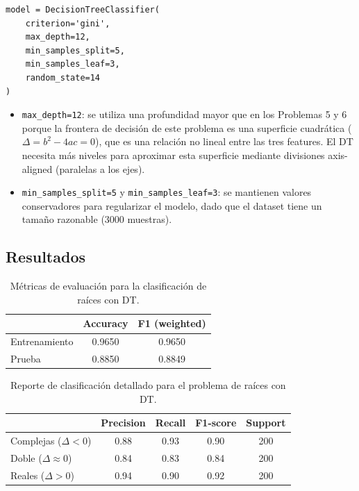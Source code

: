 \documentclass{article}
\begin{document}
\begin{lstlisting}
model = DecisionTreeClassifier(
    criterion='gini',
    max_depth=12,
    min_samples_split=5,
    min_samples_leaf=3,
    random_state=14
)
\end{lstlisting}

\begin{itemize}
    \item \texttt{max\_depth=12}: se utiliza una profundidad mayor que en los Problemas 5 y 6 porque la frontera de decisión de este problema es una superficie cuadrática (\(\Delta = b^2 - 4ac = 0\)), que es una relación no lineal entre las tres features. El DT necesita más niveles para aproximar esta superficie mediante divisiones axis-aligned (paralelas a los ejes).
    \item \texttt{min\_samples\_split=5} y \texttt{min\_samples\_leaf=3}: se mantienen valores conservadores para regularizar el modelo, dado que el dataset tiene un tamaño razonable (3000 muestras).
\end{itemize}

\subsection{Resultados}

\begin{table}[H]
\centering
\begin{tabular}{lcc}
\hline
& \textbf{Accuracy} & \textbf{F1 (weighted)} \\
\hline
Entrenamiento & 0.9650 & 0.9650 \\
Prueba        & 0.8850 & 0.8849 \\
\hline
\end{tabular}
\caption{Métricas de evaluación para la clasificación de raíces con DT.}
\label{tab:p7_resultados}
\end{table}

\begin{table}[H]
\centering
\begin{tabular}{lcccc}
\hline
& \textbf{Precision} & \textbf{Recall} & \textbf{F1-score} & \textbf{Support} \\
\hline
Complejas ($\Delta<0$)   & 0.88 & 0.93 & 0.90 & 200 \\
Doble ($\Delta\approx0$) & 0.84 & 0.83 & 0.84 & 200 \\
Reales ($\Delta>0$)      & 0.94 & 0.90 & 0.92 & 200 \\
\hline
\end{tabular}
\caption{Reporte de clasificación detallado para el problema de raíces con DT.}
\label{tab:p7_report}
\end{table}
\end{document}
